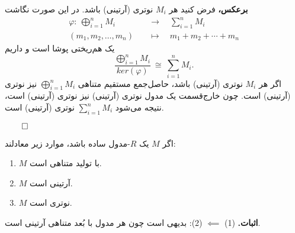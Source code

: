 \begin{frame}
    \textbf{برعکس،} فرض کنید هر $M_i$ نوترى (آرتینی) باشد. در این صورت نگاشت
    \[
        \begin{aligned}
            \varphi:\ \bigoplus_{i=1}^n M_i     \quad & \to      \quad \sum_{i=1}^n M_i   \\
            (m_1,m_2,\dots,m_n)                 \quad & \mapsto  \quad m_1+m_2+\cdots+m_n
        \end{aligned}
    \]
    یک هم‌ریختی پوشا است و داریم
    \[
        \frac{\bigoplus_{i=1}^n M_i}{ker(\varphi)} \ \cong\ \sum_{i=1}^n M_i.
    \]
    اگر هر $M_i$ نوترى (آرتینی) باشد، حاصل‌جمع مستقیم متناهی $\bigoplus_{i=1}^n M_i$ نیز نوترى (آرتینی) است.
    چون خارج‌قسمت یک مدول نوترى (آرتینی) نیز نوترى (آرتینی) است، نتیجه می‌شود $\sum_{i=1}^n M_i$ نوترى (آرتینی) است.

    \hfill\(\qed\)
\end{frame}

\begin{frame}
    \begin{theorem}
        اگر $M$ یک $R$-مدول ساده باشد، موارد زیر معادلند:
        \begin{enumerate}
            \item $M$ با تولید متناهی است.
            \item $M$ آرتینی است.
            \item $M$ نوترى است.
        \end{enumerate}
    \end{theorem}

    \textbf{اثبات.}
    (1) $\impliedby$ (2): بدیهی است چون هر مدول با بُعد متناهی آرتینی است.
\end{frame}

